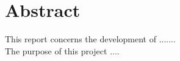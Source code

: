 \section*{Abstract}

This report concerns the development of .......\\
The purpose of this project ....


